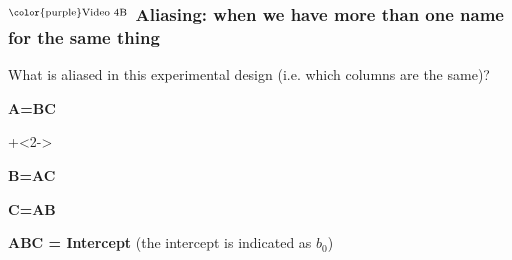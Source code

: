 \begin{frame}\frametitle{$^\text{\color{purple}Video 4B}$ Aliasing: when we have more than one name for the same thing}
	
	\vspace{1cm}
	What is aliased in this experimental design (i.e. which columns are the same)?
		
		\vspace{0.5cm}
		\begin{itemize}
			\item	\textbf{A=BC}
			
			\onslide+<2->	{
			\vspace{1cm}
			\item	\textbf{B=AC}
			
			\vspace{1cm}
			\item	\textbf{C=AB} 
			
			\vspace{1cm}
			\item	\textbf{ABC = Intercept} (the intercept is indicated as $b_0$)
			}
		\end{itemize}

\end{frame}

